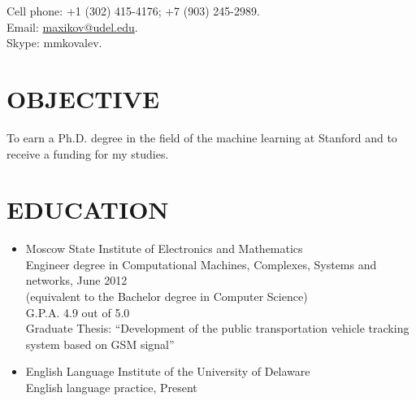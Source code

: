 \documentclass{res}
\begin{document}
 


\address{\bf  PRESENT ADDRESS\\201 Thorn Lane\\apt \#10\\Newark, DE 19711}
\address{\bf PERMANENT ADDRESS \\ 14/5 Pokrovsky boulevard \\apt \#25\\Moscow, Russia 109028}
                         

         
\begin{resume}
Cell phone: +1 (302) 415-4176; +7 (903) 245-2989.\\
Email: \href{mailto:maxikov@udel.edu}{maxikov@udel.edu}.\\
Skype: mmkovalev.\\

\section{OBJECTIVE}          
To earn a Ph.D. degree in the field of the machine learning at Stanford and to receive a funding for my studies.          
 
\section{EDUCATION}
\begin{itemize}
	\item
		Moscow State Institute of Electronics and Mathematics\\
		Engineer degree in Computational Machines, Complexes, Systems and networks, June 2012\\
		(equivalent to the Bachelor degree in Computer Science)\\
		G.P.A. 4.9 out of 5.0\\
		Graduate Thesis: ``Development of the public transportation vehicle tracking system based on GSM signal''
	\item
		English Language Institute of the University of Delaware\\
		English language practice, Present
\end{itemize}

 

\end{resume}
\end{document}
